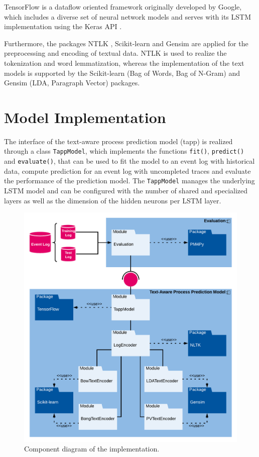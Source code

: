 TensorFlow \cite{DBLP:journals/corr/AbadiABBCCCDDDG16} is a dataflow oriented framework originally developed by Google, which includes a diverse set of neural network models and serves with its LSTM implementation using the Keras API \cite{chollet2015keras}.

Furthermore, the packages NTLK \cite{DBLP:books/daglib/0022921}, Scikit-learn \cite{DBLP:journals/jmlr/PedregosaVGMTGBPWDVPCBPD11} and Gensim \cite{rehurek_lrec} are applied for the preprocessing and encoding of textual data.
NTLK is used to realize the tokenization and word lemmatization, whereas the implementation of the text models is supported by the Scikit-learn (Bag of Words, Bag of N-Gram) and Gensim (LDA, Paragraph Vector) packages.


\section{Model Implementation}\label{sec:model-implementation}

The interface of the text-aware process prediction model (tapp) is realized through a class \texttt{TappModel}, which implements the functions \texttt{fit()},  \texttt{predict()} and  \texttt{evaluate()}, that can be used to fit the model to an event log with historical data, compute prediction for an event log with uncompleted traces and evaluate the performance of the prediction model.
The \texttt{TappModel} manages the underlying LSTM model and can be configured with the number of shared and specialized layers as well as the dimension of the hidden neurons per LSTM layer.

\begin{figure}[htbp!]
	\centering
	\includegraphics[width=\textwidth]{figures/implementation}
	\caption[Component diagram of the implementation]{Component diagram of the implementation.}
	\label{fig:/implementation}
\end{figure}

